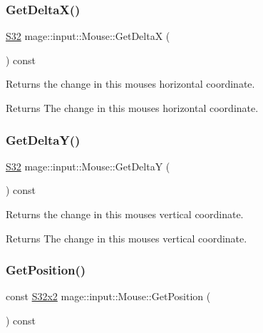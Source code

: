 \subsubsection{\texorpdfstring{Get\+Delta\+X()}{GetDeltaX()}}
{\footnotesize\ttfamily \mbox{\hyperlink{namespacemage_a2ef1a005a77358f1825d13fd481b557f}{S32}} mage\+::input\+::\+Mouse\+::\+Get\+DeltaX (\begin{DoxyParamCaption}{ }\end{DoxyParamCaption}) const\hspace{0.3cm}{\ttfamily [noexcept]}}

Returns the change in this mouse\textquotesingle{}s horizontal coordinate.

\begin{DoxyReturn}{Returns}
The change in this mouse\textquotesingle{}s horizontal coordinate. 
\end{DoxyReturn}
\mbox{\label{classmage_1_1input_1_1_mouse_a448886ed21c136f1a385101e21093aa3}} 
\subsubsection{\texorpdfstring{Get\+Delta\+Y()}{GetDeltaY()}}
{\footnotesize\ttfamily \mbox{\hyperlink{namespacemage_a2ef1a005a77358f1825d13fd481b557f}{S32}} mage\+::input\+::\+Mouse\+::\+Get\+DeltaY (\begin{DoxyParamCaption}{ }\end{DoxyParamCaption}) const\hspace{0.3cm}{\ttfamily [noexcept]}}

Returns the change in this mouse\textquotesingle{}s vertical coordinate.

\begin{DoxyReturn}{Returns}
The change in this mouse\textquotesingle{}s vertical coordinate. 
\end{DoxyReturn}
\mbox{\label{classmage_1_1input_1_1_mouse_a8127f78dd1fb1eba29c3888d40db97da}} 
\subsubsection{\texorpdfstring{Get\+Position()}{GetPosition()}}
{\footnotesize\ttfamily const \mbox{\hyperlink{namespacemage_aad06aca0b442d3b41653eafed822d571}{S32x2}} mage\+::input\+::\+Mouse\+::\+Get\+Position (\begin{DoxyParamCaption}{ }\end{DoxyParamCaption}) const\hspace{0.3cm}{\ttfamily [noexcept]}}

